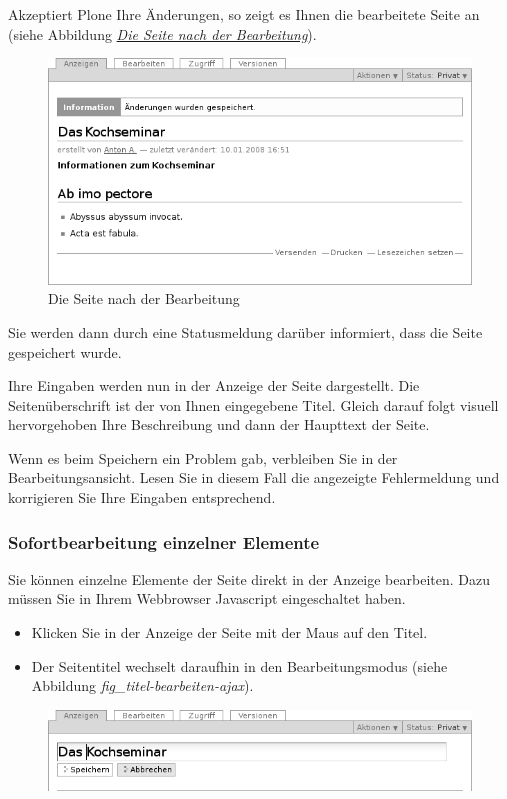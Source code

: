\documentclass[a4paper,12pt,ngerman]{manual}
\begin{document}
Akzeptiert Plone Ihre Änderungen, so zeigt es Ihnen die bearbeitete
Seite an (siehe Abbildung \hyperlink{fig-homepage-edited}{\emph{Die Seite nach der Bearbeitung}}).
\hypertarget{fig-homepage-edited}{}\begin{figure}[htbp]
\centering

\includegraphics{homepage-edited.png}
\caption{Die Seite nach der Bearbeitung}\end{figure}

Sie werden dann durch eine Statusmeldung darüber informiert, dass die Seite
gespeichert wurde.

Ihre Eingaben werden nun in der Anzeige der Seite dargestellt. Die
Seitenüberschrift ist der von Ihnen eingegebene Titel. Gleich darauf folgt
visuell hervorgehoben Ihre Beschreibung und dann der Haupttext der Seite.

Wenn es beim Speichern ein Problem gab, verbleiben Sie in der
Bearbeitungsansicht.  Lesen Sie in diesem Fall die angezeigte Fehlermeldung
und korrigieren Sie Ihre Eingaben entsprechend.


\subsubsection{Sofortbearbeitung einzelner Elemente}

Sie können einzelne Elemente der Seite direkt in der Anzeige bearbeiten. Dazu
müssen Sie in Ihrem Webbrowser Javascript eingeschaltet haben.
\begin{itemize}
\item {} 
Klicken Sie in der Anzeige der Seite mit der Maus auf den Titel.

\item {} 
Der Seitentitel wechselt daraufhin in den Bearbeitungsmodus (siehe
Abbildung \emph{fig\_titel-bearbeiten-ajax}).

\end{itemize}
\hypertarget{fig-titel-bearbeiten-ajax}{}\begin{figure}[htbp]
\centering

\includegraphics{titel-bearbeiten-ajax.png}
\end{figure}
\end{document}
